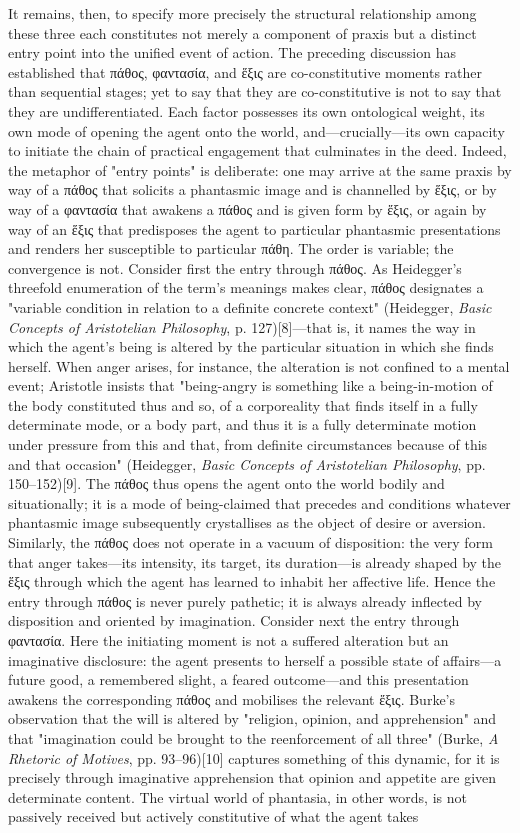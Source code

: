 \documentclass{article}
\begin{document}
It remains, then, to specify more precisely the structural relationship among these three each constitutes not merely a component of praxis but a distinct entry point into the unified event of action. The preceding discussion has established that πάθος, φαντασία, and ἕξις are co-constitutive moments rather than sequential stages; yet to say that they are co-constitutive is not to say that they are undifferentiated. Each factor possesses its own ontological weight, its own mode of opening the agent onto the world, and—crucially—its own capacity to initiate the chain of practical engagement that culminates in the deed. Indeed, the metaphor of "entry points" is deliberate: one may arrive at the same praxis by way of a πάθος that solicits a phantasmic image and is channelled by ἕξις, or by way of a φαντασία that awakens a πάθος and is given form by ἕξις, or again by way of an ἕξις that predisposes the agent to particular phantasmic presentations and renders her susceptible to particular πάθη. The order is variable; the convergence is not. Consider first the entry through πάθος. As Heidegger's threefold enumeration of the term's meanings makes clear, πάθος designates a "variable condition in relation to a definite concrete context" (Heidegger, \textit{Basic Concepts of Aristotelian Philosophy}, p. 127)[8]—that is, it names the way in which the agent's being is altered by the particular situation in which she finds herself. When anger arises, for instance, the alteration is not confined to a mental event; Aristotle insists that "being-angry is something like a being-in-motion of the body constituted thus and so, of a corporeality that finds itself in a fully determinate mode, or a body part, and thus it is a fully determinate motion under pressure from this and that, from definite circumstances because of this and that occasion" (Heidegger, \textit{Basic Concepts of Aristotelian Philosophy}, pp. 150–152)[9]. The πάθος thus opens the agent onto the world bodily and situationally; it is a mode of being-claimed that precedes and conditions whatever phantasmic image subsequently crystallises as the object of desire or aversion. Similarly, the πάθος does not operate in a vacuum of disposition: the very form that anger takes—its intensity, its target, its duration—is already shaped by the ἕξις through which the agent has learned to inhabit her affective life. Hence the entry through πάθος is never purely pathetic; it is always already inflected by disposition and oriented by imagination. Consider next the entry through φαντασία. Here the initiating moment is not a suffered alteration but an imaginative disclosure: the agent presents to herself a possible state of affairs—a future good, a remembered slight, a feared outcome—and this presentation awakens the corresponding πάθος and mobilises the relevant ἕξις. Burke's observation that the will is altered by "religion, opinion, and apprehension" and that "imagination could be brought to the reenforcement of all three" (Burke, \textit{A Rhetoric of Motives}, pp. 93–96)[10] captures something of this dynamic, for it is precisely through imaginative apprehension that opinion and appetite are given determinate content. The virtual world of phantasia, in other words, is not passively received but actively constitutive of what the agent takes 
\end{document}
